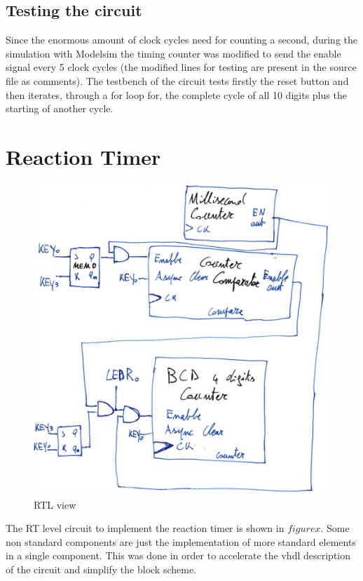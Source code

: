 \documentclass[12pt]{article}
\begin{document}
\subsection{Testing the circuit}
Since the enormous amount of clock cycles need for counting a second, during the simulation with Modelsim the timing counter was modified to send the enable signal every 5 clock cycles (the modified lines for testing are present in the source file as comments).\newline
The testbench of the circuit tests firstly the reset button and then iterates, through a for loop for, the complete cycle of all 10 digits plus the starting of another cycle.
\section{Reaction Timer}
\begin{figure}[h]
\centering
\includegraphics[scale = 0.6]{immagini/RT5.jpg}
\caption{RTL view}
\end{figure}
The RT level circuit to implement the reaction timer is shown in $figure x$. Some non standard components are just the implementation of more standard elements in a single component. This was done in order to accelerate the vhdl description of the circuit and simplify the block scheme.
\end{document}
